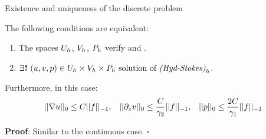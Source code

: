 \begin{frame}{Existence and uniqueness of the discrete problem}
  \begin{theorem}
    The following conditions are equivalent:
    \begin{enumerate}
    \item The spaces $U_h$, $V_h$, $P_h$ verify \ISph and \ISvh.
    \item $\boldsymbol{\exists!} \ (u,v,p)\in
      U_h\times V_h \times P_h \ \text{solution of \ensuremath{\text{\emph{(Hyd-Stokes)}}_h}}$.
    \end{enumerate}
    \medskip
    Furthermore, in this case: \vspace{-0.8em}
  \begin{equation*}
    \begin{aligned}
      ||\nabla u||_0 \le C ||f||_{-1}, &&
      ||\partial_z v||_0  \le \frac C {\gamma_2}||f||_{-1}, &&
      ||p||_0  \le \frac{2C} {\gamma_1}||f||_{-1}
    \end{aligned}
  \end{equation*}
  \end{theorem}
  \medskip
  {\gris \textbf{Proof}: Similar to the continuous case. \hfill $\square$}
\end{frame}

